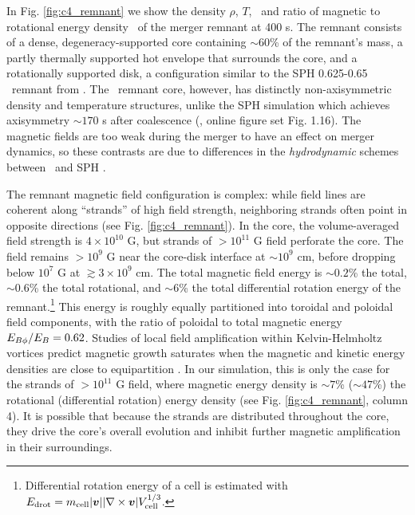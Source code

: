 In Fig. \ref{fig:c4_remnant} we show the density $\rho$, $T$, \Bmag\ and ratio of magnetic to rotational energy density \eberot\ of the merger remnant at 400 s.  The remnant consists of a dense, degeneracy-supported core containing $\sim60$\% of the remnant's mass, a partly thermally supported hot envelope that surrounds the core, and a rotationally supported disk, a configuration similar to the SPH 0.625-0.65 \Msun\ remnant from \citeal{zhu+13}.  The \arepo\ remnant core, however, has distinctly non-axisymmetric density and temperature structures, unlike the SPH simulation which achieves axisymmetry $\sim170$ s after coalescence (\citeal{zhu+13}, online figure set Fig. 1.16).  The magnetic fields are too weak during the merger to have an effect on merger dynamics, so these contrasts are due to differences in the \textit{hydrodynamic} schemes between \arepo\ and SPH \Zhuprep.



The remnant magnetic field configuration is complex: while field lines are coherent along ``strands'' of high field strength, neighboring strands often point in opposite directions (see Fig. \ref{fig:c4_remnant}).  In the core, the volume-averaged field strength is $4\times10^{10}$ G, but strands of $>10^{11}$ G field perforate the core.  The field remains $>10^9$ G near the core-disk interface at $\sim 10^9$ cm, before dropping below $10^7$ G at $\gtrsim 3\times10^9$ cm.  The total magnetic field energy is $\sim0.2$\% the total, $\sim0.6$\% the total rotational, and $\sim6$\% the total differential rotation energy of the remnant.\footnote{Differential rotation energy of a cell is estimated with $E_\mathrm{drot} = m_\mathrm{cell}|\boldsymbol{v}||\nabla\times\boldsymbol{v}|V_\mathrm{cell}^{1/3}$.}  This energy is roughly equally partitioned into toroidal and poloidal field components, with the ratio of poloidal to total magnetic energy $\EBphiEB = 0.62$.  Studies of local field amplification within Kelvin-Helmholtz vortices predict magnetic growth saturates when the magnetic and kinetic energy densities are close to equipartition \citep{oberam10, zrakm13}.  In our simulation, this is only the case for the strands of $>10^{11}$ G field, where magnetic energy density is $\sim7$\% ($\sim47$\%) the rotational (differential rotation) energy density (see Fig. \ref{fig:c4_remnant}, column 4).  It is possible that because the strands are distributed throughout the core, they drive the core's overall evolution and inhibit further magnetic amplification in their surroundings.

